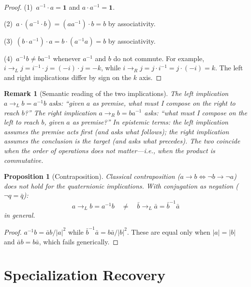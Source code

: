 \documentclass[11pt,a4paper]{article}
\newtheorem{proposition}[theorem]{Proposition}
\newtheorem{remark}[theorem]{Remark}
\begin{document}
\begin{proof}
(1)~$a^{-1} \cdot a = \mathbf{1}$ and $a \cdot a^{-1} = \mathbf{1}$.

(2)~$a \cdot (a^{-1} \cdot b) = (a a^{-1}) \cdot b = b$ by
associativity.

(3)~$(b \cdot a^{-1}) \cdot a = b \cdot (a^{-1} a) = b$ by
associativity.

(4)~$a^{-1} b \neq b a^{-1}$ whenever $a^{-1}$ and $b$ do not commute.
For example, $i \to_L j = i^{-1} \cdot j = (-i) \cdot j = -k$,
while $i \to_R j = j \cdot i^{-1} = j \cdot (-i) = k$. The left
and right implications differ by sign on the $k$ axis.
\end{proof}

\begin{remark}[Semantic reading of the two implications]
The left implication $a \to_L b = a^{-1} b$ asks: ``given $a$ as
premise, what must I compose on the right to reach $b$?'' The right
implication $a \to_R b = b a^{-1}$ asks: ``what must I compose on the
left to reach $b$, given $a$ as premise?'' In epistemic terms: the left
implication assumes the premise acts first (and asks what follows); the
right implication assumes the conclusion is the target (and asks what
precedes). The two coincide when the order of operations does not
matter---i.e., when the product is commutative.
\end{remark}

\begin{proposition}[Contraposition]
\label{prop:contraposition}
Classical contraposition ($a \to b \iff \neg b \to \neg a$) does
\emph{not} hold for the quaternionic implications. With conjugation as
negation ($\neg q = \bar{q}$):
\begin{equation}
a \to_L b = a^{-1} b
  \quad\neq\quad
  \bar{b} \to_L \bar{a} = \bar{b}^{-1} \bar{a}
\end{equation}
in general.
\end{proposition}

\begin{proof}
$a^{-1} b = \bar{a} b / |a|^2$ while
$\bar{b}^{-1} \bar{a} = b \bar{a} / |b|^2$. These are equal only when
$|a| = |b|$ and $\bar{a} b = b \bar{a}$, which fails generically.
\end{proof}

\section{Specialization Recovery}
\label{sec:specialization}
\end{document}
